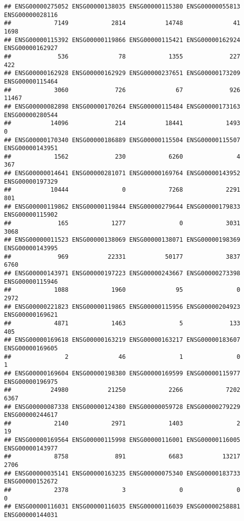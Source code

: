 \documentclass[
]{article}
\begin{document}
\begin{verbatim}
## ENSG00000275052 ENSG00000138035 ENSG00000115380 ENSG00000055813 ENSG00000028116 
##            7149            2814           14748              41            1698 
## ENSG00000115392 ENSG00000119866 ENSG00000115421 ENSG00000162924 ENSG00000162927 
##             536              78            1355             227             422 
## ENSG00000162928 ENSG00000162929 ENSG00000237651 ENSG00000173209 ENSG00000115464 
##            3060             726              67             926           11467 
## ENSG00000082898 ENSG00000170264 ENSG00000115484 ENSG00000173163 ENSG00000280544 
##           14096             214           18441            1493               0 
## ENSG00000170340 ENSG00000186889 ENSG00000115504 ENSG00000115507 ENSG00000143951 
##            1562             230            6260               4             367 
## ENSG00000014641 ENSG00000281071 ENSG00000169764 ENSG00000143952 ENSG00000197329 
##           10444               0            7268            2291             801 
## ENSG00000119862 ENSG00000119844 ENSG00000279644 ENSG00000179833 ENSG00000115902 
##             165            1277               0            3031            3068 
## ENSG00000011523 ENSG00000138069 ENSG00000138071 ENSG00000198369 ENSG00000143995 
##             969           22331           50177            3837            6760 
## ENSG00000143971 ENSG00000197223 ENSG00000243667 ENSG00000273398 ENSG00000115946 
##            1088            1960              95               0            2972 
## ENSG00000221823 ENSG00000119865 ENSG00000115956 ENSG00000204923 ENSG00000169621 
##            4871            1463               5             133             405 
## ENSG00000169618 ENSG00000163219 ENSG00000163217 ENSG00000183607 ENSG00000169605 
##               2              46               1               0               1 
## ENSG00000169604 ENSG00000198380 ENSG00000169599 ENSG00000115977 ENSG00000196975 
##           24980           21250            2266            7202            6367 
## ENSG00000087338 ENSG00000124380 ENSG00000059728 ENSG00000279229 ENSG00000244617 
##            2140            2971            1403               2              19 
## ENSG00000169564 ENSG00000115998 ENSG00000116001 ENSG00000116005 ENSG00000143977 
##            8758             891            6683           13217            2706 
## ENSG00000035141 ENSG00000163235 ENSG00000075340 ENSG00000183733 ENSG00000152672 
##            2378               3               0               0               0 
## ENSG00000116031 ENSG00000116035 ENSG00000116039 ENSG00000258881 ENSG00000144031 

\end{verbatim}
\end{document}
